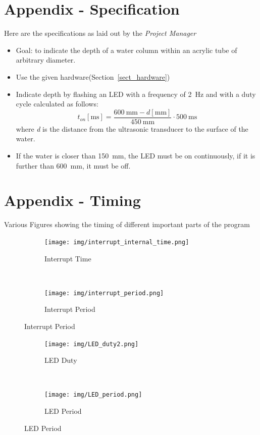 \documentclass[a4paper]{article}
\begin{document}
\newpage
\section{Appendix - Specification} \label{sect:specificaton}
Here are the specifications as laid out by the \textit{Project Manager} 
\begin{itemize}
    \item Goal: to indicate the depth of a water column within an acrylic tube of arbitrary diameter.
    \item Use the given hardware(Section~\ref{sect_hardware})
    \item Indicate depth by flashing an LED with a frequency of \SI{2}{\hertz} and with a duty cycle calculated as follows:
        \begin{equation}
            t_{on}[\si{\ms}] = \frac{\SI{600}{\mm} - d[\si{\mm}]}{\SI{450}{\mm}} \cdot \SI{500}{\ms}
        \end{equation}
        where \textit{d} is the distance from the ultrasonic transducer to the surface of the water.
    \item If the water is closer than \SI{150}{\mm}, the LED must be on continuously, if it is further than \SI{600}{\mm}, it must be off. 
\end{itemize} 


\newpage
\section{Appendix - Timing}
Various Figures showing the timing of different important parts of the program

\begin{figure}[h!]
    \centering
    \begin{subfigure}[b]{0.5\textwidth}
        \texttt{[image: img/interrupt\_internal\_time.png]}
        \caption{Interrupt Time}
    \end{subfigure}~
    \begin{subfigure}[b]{0.5\textwidth}
        \texttt{[image: img/interrupt\_period.png]}
        \caption{Interrupt Period}
\end{subfigure}
\end{figure}

\begin{figure}[h!]
    \centering
    \begin{subfigure}[b]{0.5\textwidth}
        \texttt{[image: img/LED\_duty2.png]}
        \caption{LED Duty}
    \end{subfigure}~
    \begin{subfigure}[b]{0.5\textwidth}
        \texttt{[image: img/LED\_period.png]}
        \caption{LED Period}
\end{subfigure}
\end{figure}
\end{document}
